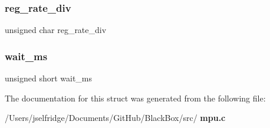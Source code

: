 \subsubsection{reg\+\_\+rate\+\_\+div}
{\footnotesize\ttfamily unsigned char reg\+\_\+rate\+\_\+div}

\mbox{\label{structtest__s_a0abed830f8dc38c7bd17ce78ee2530d8}} 
\subsubsection{wait\+\_\+ms}
{\footnotesize\ttfamily unsigned short wait\+\_\+ms}



The documentation for this struct was generated from the following file\+:\begin{DoxyCompactItemize}
\item 
/\+Users/jselfridge/\+Documents/\+Git\+Hub/\+Black\+Box/src/\textbf{ mpu.\+c}\end{DoxyCompactItemize}
